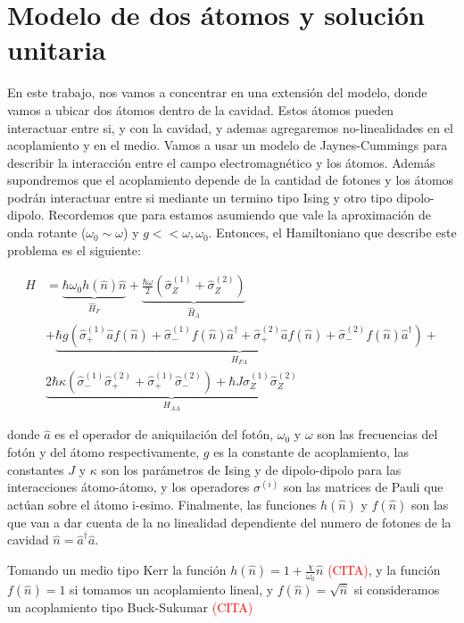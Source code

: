 \section{Modelo de dos átomos y solución unitaria}
En este trabajo, nos vamos a concentrar en una extensión del modelo, donde vamos a ubicar dos átomos dentro de la cavidad. Estos átomos pueden interactuar entre si, y con la cavidad, y ademas agregaremos no-linealidades en el acoplamiento y en el medio.
Vamos a usar un modelo de Jaynes-Cummings para describir la interacci\'on entre el campo electromagn\'etico y los átomos. Adem\'as supondremos que el acoplamiento depende de la cantidad de fotones y los átomos podr\'an interactuar entre si mediante un termino tipo Ising y otro tipo dipolo-dipolo. Recordemos que para estamos asumiendo que vale la aproximaci\'on de onda rotante ($\omega_0 \sim \omega$) y $g << \omega,\omega_0$.
Entonces, el Hamiltoniano que describe este problema es el siguiente:

\begin{equation}
\begin{split}
     \hat H & =\underbrace{\hbar \omega_0 h(\hat n) \hat n }_{\hat H_F}+\underbrace{\frac{\hbar \omega}{2}(\hat\sigma_Z^{(1)}+\hat\sigma_Z^{(2)})}_{\hat H_A}   \\ 
     & + \underbrace{\hbar g(\hat\sigma_+^{(1)}\hat a f(\hat n)+\hat\sigma_-^{(1)}f(\hat n) \hat a^\dagger + \hat\sigma_+^{(2)}\hat a f(\hat n)+\hat\sigma_-^{(2)}f(\hat n) \hat a^\dagger)}_{H_{FA}} + \\ & \underbrace{2\hbar \kappa (\hat \sigma_-^{(1)}\hat \sigma_+^{(2)}+\hat \sigma_+^{(1)}\hat \sigma_-^{(2)}) + \hbar J \hat \sigma_Z^{(1)}\hat \sigma_Z^{(2)}}_{H_{AA}}
\end{split}
\end{equation}

donde $\hat a$ es el operador de aniquilaci\'on del fot\'on, $\omega_0$ y $\omega$ son las frecuencias del fot\'on y del átomo respectivamente, $g$ es la constante de acoplamiento, las constantes $J$ y $\kappa$ son los par\'ametros de Ising y de dipolo-dipolo para las interacciones átomo-átomo, y los operadores $\sigma^{(i)}$ son las matrices de Pauli que act\'uan sobre el átomo i-esimo. Finalmente, las funciones $h(\hat n)$ y $f(\hat n)$ son las que van a dar cuenta de la no linealidad dependiente del numero de fotones de la cavidad $\hat n = \hat a^\dagger \hat a$. 

Tomando un medio tipo Kerr la funci\'on $h(\hat n)=1+\frac{\chi}{\omega_0}\hat n$ \cite{}\textcolor{red}{(CITA)}, y la funci\'on $f(\hat n) =1$ si tomamos un acoplamiento lineal, y $f(\hat n) = \sqrt{\hat n}$ si consideramos un acoplamiento tipo Buck-Sukumar \cite{}\textcolor{red}{(CITA)}

